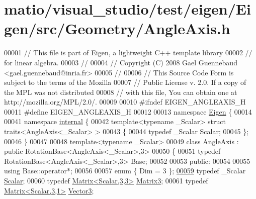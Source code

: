 \hypertarget{matio_2visual__studio_2test_2eigen_2_eigen_2src_2_geometry_2_angle_axis_8h_source}{}\section{matio/visual\+\_\+studio/test/eigen/\+Eigen/src/\+Geometry/\+Angle\+Axis.h}
\label{matio_2visual__studio_2test_2eigen_2_eigen_2src_2_geometry_2_angle_axis_8h_source}

\begin{DoxyCode}
00001 \textcolor{comment}{// This file is part of Eigen, a lightweight C++ template library}
00002 \textcolor{comment}{// for linear algebra.}
00003 \textcolor{comment}{//}
00004 \textcolor{comment}{// Copyright (C) 2008 Gael Guennebaud <gael.guennebaud@inria.fr>}
00005 \textcolor{comment}{//}
00006 \textcolor{comment}{// This Source Code Form is subject to the terms of the Mozilla}
00007 \textcolor{comment}{// Public License v. 2.0. If a copy of the MPL was not distributed}
00008 \textcolor{comment}{// with this file, You can obtain one at http://mozilla.org/MPL/2.0/.}
00009 
00010 \textcolor{preprocessor}{#ifndef EIGEN\_ANGLEAXIS\_H}
00011 \textcolor{preprocessor}{#define EIGEN\_ANGLEAXIS\_H}
00012 
00013 \textcolor{keyword}{namespace }\hyperlink{namespace_eigen}{Eigen} \{ 
00014 
00041 \textcolor{keyword}{namespace }\hyperlink{namespaceinternal}{internal} \{
00042 \textcolor{keyword}{template}<\textcolor{keyword}{typename} \_Scalar> \textcolor{keyword}{struct }traits<AngleAxis<\_Scalar> >
00043 \{
00044   \textcolor{keyword}{typedef} \_Scalar Scalar;
00045 \};
00046 \}
00047 
00048 \textcolor{keyword}{template}<\textcolor{keyword}{typename} \_Scalar>
00049 \textcolor{keyword}{class }AngleAxis : \textcolor{keyword}{public} RotationBase<AngleAxis<\_Scalar>,3>
00050 \{
00051   \textcolor{keyword}{typedef} RotationBase<AngleAxis<\_Scalar>,3> Base;
00052 
00053 \textcolor{keyword}{public}:
00054 
00055   \textcolor{keyword}{using} Base::operator*;
00056 
00057   \textcolor{keyword}{enum} \{ Dim = 3 \};
\hyperlink{group___geometry___module_acd9b10692d7d726b28670e4d3a282fe8}{00059}   \textcolor{keyword}{typedef} \_Scalar \hyperlink{group___geometry___module_acd9b10692d7d726b28670e4d3a282fe8}{Scalar};
00060   \textcolor{keyword}{typedef} \hyperlink{group___core___module_class_eigen_1_1_matrix}{Matrix<Scalar,3,3>} \hyperlink{group___core___module_class_eigen_1_1_matrix}{Matrix3};
00061   \textcolor{keyword}{typedef} \hyperlink{group___core___module}{Matrix<Scalar,3,1>} \hyperlink{group___core___module}{Vector3};

\end{DoxyCode}
